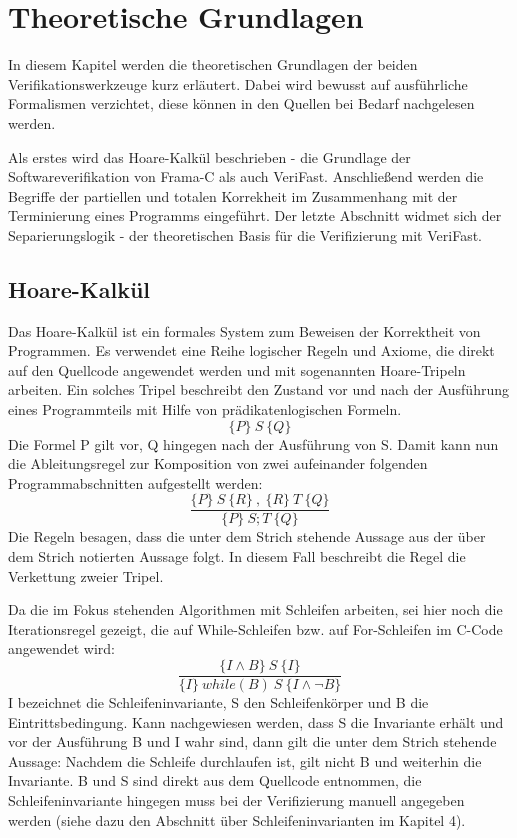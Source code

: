 ﻿
\chapter{Theoretische Grundlagen}

In diesem Kapitel werden die theoretischen Grundlagen der beiden Verifikationswerkzeuge kurz erläutert. Dabei wird bewusst
auf ausführliche Formalismen verzichtet, diese können in den Quellen bei Bedarf nachgelesen werden.

Als erstes wird das Hoare-Kalkül beschrieben - die Grundlage der Softwareverifikation von Frama-C als auch VeriFast.
Anschließend werden die Begriffe der partiellen und totalen Korrekheit im Zusammenhang mit der Terminierung eines Programms
eingeführt. Der letzte Abschnitt widmet sich der Separierungslogik - der theoretischen Basis für die Verifizierung
mit VeriFast.

\section{Hoare-Kalkül}

Das Hoare-Kalkül ist ein formales System zum Beweisen der Korrektheit von Programmen. Es verwendet eine Reihe logischer
Regeln und Axiome, die direkt auf den Quellcode angewendet werden und mit sogenannten Hoare-Tripeln arbeiten. Ein solches
Tripel beschreibt den Zustand vor und nach der Ausführung eines Programmteils mit Hilfe von prädikatenlogischen
Formeln.
\begin{displaymath}
\{P\} \: S \: \{Q\}
\end{displaymath}
Die Formel P gilt vor, Q hingegen nach der Ausführung von S. Damit kann nun die Ableitungsregel zur Komposition von
zwei aufeinander folgenden Programmabschnitten aufgestellt werden:
\begin{displaymath}
\frac{\{P\} \:S\: \{R\} \:, \: \{R\} \: T \: \{Q\}}{\{P\}\: S; T \: \{Q\}}
\end{displaymath}
Die Regeln besagen, dass die unter dem Strich stehende Aussage aus der über dem Strich notierten Aussage folgt. In diesem
Fall beschreibt die Regel die Verkettung zweier Tripel.

Da die im Fokus stehenden Algorithmen mit Schleifen arbeiten, sei hier noch die Iterationsregel gezeigt, die auf While-Schleifen
bzw. auf For-Schleifen im C-Code angewendet wird: 
\begin{displaymath}
\frac{\{I \land B\} \:S\: \{I\}}{\{I\}\: while(B)\: S\: \{I \land \neg B\}}
\end{displaymath}
I bezeichnet die Schleifeninvariante, S den Schleifenkörper und B die Eintrittsbedingung. Kann nachgewiesen werden,
dass S die Invariante erhält und vor der Ausführung B und I wahr sind, dann gilt die unter dem Strich stehende Aussage: Nachdem
die Schleife durchlaufen ist, gilt nicht B und weiterhin die Invariante. B und S sind direkt aus dem Quellcode entnommen, 
die Schleifeninvariante hingegen muss bei der Verifizierung  manuell angegeben werden (siehe dazu den Abschnitt über 
Schleifeninvarianten im Kapitel 4).

